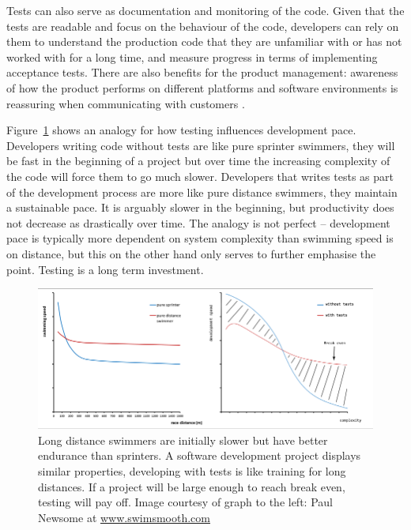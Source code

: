 \documentclass[11pt]{article}
\begin{document}
Tests can also serve as documentation and monitoring of the code. Given that the tests are readable and focus on the behaviour of the code, developers can rely on them to understand the production code that they are unfamiliar with or has not worked with for a long time, and measure progress in terms of implementing acceptance tests. There are also benefits for the product management: awareness of how the product performs on different platforms and software environments is reassuring when communicating with customers \cite[question~38]{Ahnve}.

Figure~\ref{fig:distance} shows an analogy for how testing influences development pace. Developers writing code without tests are like pure sprinter swimmers, they will be fast in the beginning of a project but over time the increasing complexity of the code will force them to go much slower. Developers that writes tests as part of the development process are more like pure distance swimmers, they maintain a sustainable pace. It is arguably slower in the beginning, but productivity does not decrease as drastically over time. The analogy is not perfect -- development pace is typically more dependent on system complexity than swimming speed is on distance, but this on the other hand only serves to further emphasise the point. Testing is a long term investment.

\begin{figure}[ht]
\centering
\includegraphics[width=\textwidth]{pics/distance.png}
\caption{Long distance swimmers are initially slower but have better endurance than sprinters.
A software development project displays similar properties, developing with tests is like training for long distances.
If a project will be large enough to reach break even, testing will pay off.
Image courtesy of graph to the left: Paul Newsome at \small \url{www.swimsmooth.com}}
\label{fig:distance}
\end{figure}
\end{document}
